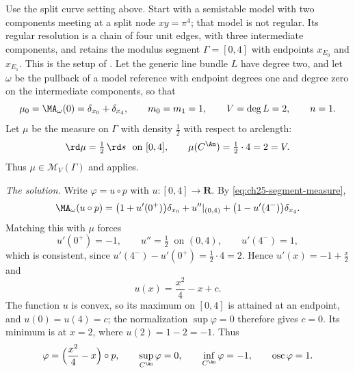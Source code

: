 \begin{example}
\label{ex:ch29-curve-solution}
Use the split curve setting above.  Start with a semistable model
with two components meeting at a split node $xy=\pi^4$; that model is
not regular.  Its regular resolution is a chain of four unit edges,
with three intermediate components, and retains the modulus segment
$\Gamma=[0,4]$ with endpoints $x_{E_0}$ and $x_{E_1}$.
This is the setup of .
Let the generic line bundle $L$ have degree two, and let $\omega$
be the pullback of a model reference with endpoint degrees one and
degree zero on the intermediate components, so that
\[
 \mu_0=\MA_\omega(0)=\delta_{x_0}+\delta_{x_4},
 \qquad m_0=m_1=1,\qquad V=\deg L=2,\qquad n=1 .
\]
Let $\mu$ be the measure on $\Gamma$ with density $\tfrac12$ with
respect to arclength:
\[
 \rd\mu=\tfrac12\,\rd s\ \text{ on }[0,4],
 \qquad \mu(C^{\An})=\tfrac12\cdot4=2=V .
\]
Thus $\mu\in\mathcal M_V(\Gamma)$ and 
applies.

\emph{The solution.}  Write $\varphi=u\circ p$ with
$u:[0,4]\to\mathbf R$.  By \eqref{eq:ch25-segment-measure},
\[
 \MA_\omega(u\circ p)
 =\bigl(1+u'(0^+)\bigr)\delta_{x_0}
  +u''|_{(0,4)}
  +\bigl(1-u'(4^-)\bigr)\delta_{x_4} .
\]
Matching this with $\mu$ forces
\[
 u'(0^+)=-1,\qquad u''=\tfrac12\ \text{ on }(0,4),
 \qquad u'(4^-)=1,
\]
which is consistent, since $u'(4^-)-u'(0^+)=\tfrac12\cdot4=2$.  Hence
$u'(x)=-1+\tfrac x2$ and
\begin{equation}
\label{eq:ch29-curve-solution}
 u(x)=\frac{x^2}{4}-x+c .
\end{equation}
The function $u$ is convex, so its maximum on $[0,4]$ is attained at an
endpoint, and $u(0)=u(4)=c$; the normalization $\sup\varphi=0$ therefore
gives $c=0$.  Its minimum is at $x=2$, where $u(2)=1-2=-1$.  Thus
\begin{equation}
\label{eq:ch29-curve-solution-values}
 \varphi=\Bigl(\frac{x^2}{4}-x\Bigr)\circ p,
 \qquad \sup_{C^{\An}}\varphi=0,
 \qquad \inf_{C^{\An}}\varphi=-1,
 \qquad \operatorname{osc}\varphi=1 .
\end{equation}


\end{example}
